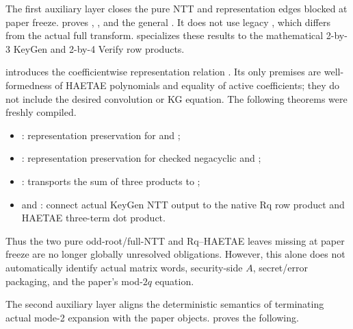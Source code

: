 The first auxiliary layer closes the pure NTT and representation edges blocked
at paper freeze.
\allowbreak
{} proves
,
, and the general
. It does not use legacy
, which differs from the actual full transform.
\allowbreak{} specializes
these results to the mathematical 2-by-3 KeyGen and 2-by-4 Verify row products.

 introduces the coefficientwise representation
relation . Its only premises are well-formedness of
HAETAE polynomials and equality of active coefficients; they do not include the
desired convolution or KG equation. The following theorems were freshly compiled.

\begin{itemize}
  \item {}: representation preservation for
         and ;
  \item {}: representation preservation for checked
        negacyclic  and ;
  \item {}: transports the sum of three products
        to ;
  \item {} and
        : connect actual KeyGen NTT
        output to the native Rq row product and HAETAE three-term dot product.
\end{itemize}

Thus the two pure odd-root/full-NTT and Rq--HAETAE leaves missing at paper freeze
are no longer globally unresolved obligations. However, this alone does not
automatically identify actual matrix words, security-side \(A\), secret/error
packaging, and the paper's mod-\(2q\) equation.

The second auxiliary layer aligns the deterministic semantics of terminating
actual mode-2  expansion with the paper objects.
 proves the following.

